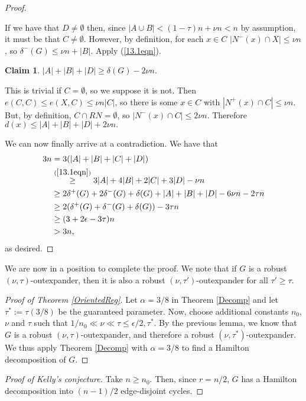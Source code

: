 \documentclass[10pt,letterpaper, reqno]{amsart}
\theoremstyle{definition}
\numberwithin{equation}{section}
\newtheorem{claim}{Claim}
\begin{document}
\begin{proof}
\begin{adjustwidth}{2.5em}{0pt}
		If we have that $D \neq \emptyset$ then, since $|A \cup B| < (1-\tau)n + \nu n < n$ by assumption, it must be that $C \neq \emptyset$. However, by definition, for each $x \in C$ $|N^-(x) \cap X| \leq \nu n$, so $\delta^-(G) \leq \nu n + |B|$. Apply (\ref{13.1eqn}). 
	\end{adjustwidth}
	\begin{claim}
		$|A| + |B| + |D| \geq \delta(G) - 2\nu n$.
	\end{claim}
	\begin{adjustwidth}{2.5em}{0pt}
		This is trivial if $C = \emptyset$, so we suppose it is not. Then $e(C,C) \leq e(X,C) \leq \nu n |C|$, so there is some $x \in C$ with $|N^+(x) \cap C| \leq \nu n$. But, by definition, $C \cap RN = \emptyset$, so $|N^-(x) \cap C| \leq 2\nu n$. Therefore $d(x) \leq |A| + |B| + |D| + 2\nu n. $
	\end{adjustwidth}
	We can now finally arrive at a contradiction. We have that 
	\begin{align*}
		3n & = 3(|A|+|B|+|C| +|D|) \\
		&\overset{(\ref{13.1eqn}) }{\geq} 3|A| + 4|B| + 2|C| + 3 |D| - \nu n \\
		&\geq 2\delta^+(G) + 2\delta^-(G) + \delta(G) + |A| + |B| + |D| - 6 \nu n - 2\tau n \\
		&\geq 2(\delta^+(G) + \delta^-(G) + \delta(G))-3\tau n  \\
		& \geq (3 + 2\epsilon  - 3\tau )n \\
		&>3n, 
	\end{align*}
	as desired.
\end{proof}

\noindent We are now in a position to complete the proof. We note that if $G$ is a robust $(\nu,\tau)$-outexpander, then it is also a robust $(\nu,\tau')$-outexpander for all $\tau'\geq \tau$. 

\begin{proof}[Proof of Theorem \ref*{OrientedReg}]
	Let $\alpha = 3/8$ in Theorem \ref{Decomp} and let $\tau^* := \tau(3/8)$ be the guaranteed parameter. Now, choose additional constants $n_0$, $\nu$ and $\tau$ such that $1/n_0 \ll \nu \ll \tau \leq \epsilon/2, \tau^*$. By the previous lemma, we know that $G$ is a robust $(\nu,\tau)$-outexpander, and therefore a robust $(\nu,\tau^*)$-outexpander. We thus apply Theorem \ref{Decomp} with $\alpha = 3/8$ to find a Hamilton decomposition of $G$. 
\end{proof}

\begin{proof}[Proof of Kelly's conjecture]
	Take $n \geq n_0$. Then, since $r=n/2$, $G$ has a Hamilton decomposition into $(n-1)/2$ edge-disjoint cycles. 
\end{proof}
\end{document}
